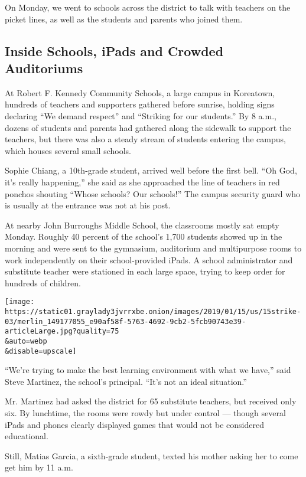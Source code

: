On Monday, we went to schools across the district to talk with teachers
on the picket lines, as well as the students and parents who joined
them.

\hypertarget{inside-schools-ipads-and-crowded-auditoriums}{%
\subsection{Inside Schools, iPads and Crowded
Auditoriums}\label{inside-schools-ipads-and-crowded-auditoriums}}

At Robert F. Kennedy Community Schools, a large campus in Koreatown,
hundreds of teachers and supporters gathered before sunrise, holding
signs declaring ``We demand respect'' and ``Striking for our students.''
By 8 a.m., dozens of students and parents had gathered along the
sidewalk to support the teachers, but there was also a steady stream of
students entering the campus, which houses several small schools.

Sophie Chiang, a 10th-grade student, arrived well before the first bell.
``Oh God, it's really happening,'' she said as she approached the line
of teachers in red ponchos shouting ``Whose schools? Our schools!'' The
campus security guard who is usually at the entrance was not at his
post.

At nearby John Burroughs Middle School, the classrooms mostly sat empty
Monday. Roughly 40 percent of the school's 1,700 students showed up in
the morning and were sent to the gymnasium, auditorium and multipurpose
rooms to work independently on their school-provided iPads. A school
administrator and substitute teacher were stationed in each large space,
trying to keep order for hundreds of children.

\texttt{[image: https://static01.graylady3jvrrxbe.onion/images/2019/01/15/us/15strike-03/merlin\_149177055\_e90af58f-5763-4692-9cb2-5fcb90743e39-articleLarge.jpg?quality=75\\\&auto=webp\\\&disable=upscale]}

``We're trying to make the best learning environment with what we
have,'' said Steve Martinez, the school's principal. ``It's not an ideal
situation.''

Mr. Martinez had asked the district for 65 substitute teachers, but
received only six. By lunchtime, the rooms were rowdy but under control
--- though several iPads and phones clearly displayed games that would
not be considered educational.

Still, Matias Garcia, a sixth-grade student, texted his mother asking
her to come get him by 11 a.m.

